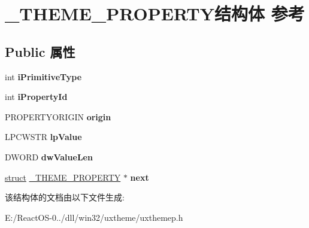 \hypertarget{struct___t_h_e_m_e___p_r_o_p_e_r_t_y}{}\section{\+\_\+\+T\+H\+E\+M\+E\+\_\+\+P\+R\+O\+P\+E\+R\+T\+Y结构体 参考}
\label{struct___t_h_e_m_e___p_r_o_p_e_r_t_y}
\subsection*{Public 属性}
\begin{DoxyCompactItemize}
\item 
\mbox{\label{struct___t_h_e_m_e___p_r_o_p_e_r_t_y_a49c0e2b8ce82e6456d90dc799f05d39c}} 
int {\bfseries i\+Primitive\+Type}
\item 
\mbox{\label{struct___t_h_e_m_e___p_r_o_p_e_r_t_y_a9c1e80e812909a46689f4d14e234540b}} 
int {\bfseries i\+Property\+Id}
\item 
\mbox{\label{struct___t_h_e_m_e___p_r_o_p_e_r_t_y_a36b6a08b5847b0e400d31c5799939c5f}} 
P\+R\+O\+P\+E\+R\+T\+Y\+O\+R\+I\+G\+IN {\bfseries origin}
\item 
\mbox{\label{struct___t_h_e_m_e___p_r_o_p_e_r_t_y_af21d8c82bd625cea589474f8cb35a08d}} 
L\+P\+C\+W\+S\+TR {\bfseries lp\+Value}
\item 
\mbox{\label{struct___t_h_e_m_e___p_r_o_p_e_r_t_y_aa752577242d65451db62ad21aa848d9a}} 
D\+W\+O\+RD {\bfseries dw\+Value\+Len}
\item 
\mbox{\label{struct___t_h_e_m_e___p_r_o_p_e_r_t_y_abe72fa14982b26f9ca00871c05b0d069}} 
\hyperlink{interfacestruct}{struct} \hyperlink{struct___t_h_e_m_e___p_r_o_p_e_r_t_y}{\+\_\+\+T\+H\+E\+M\+E\+\_\+\+P\+R\+O\+P\+E\+R\+TY} $\ast$ {\bfseries next}
\end{DoxyCompactItemize}


该结构体的文档由以下文件生成\+:\begin{DoxyCompactItemize}
\item 
E\+:/\+React\+O\+S-\/0../dll/win32/uxtheme/uxthemep.\+h\end{DoxyCompactItemize}
